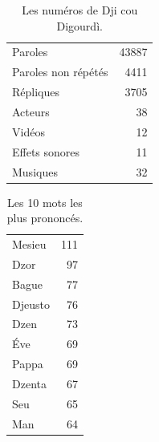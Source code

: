 
\vfill
\begin{table}[h]
\centering
\caption{Les numéros de Dji cou Digourdì.}
\begin{tabular}{lr}
    \toprule
Paroles & 43887 \\
Paroles non répétés & 4411 \\
Répliques & 3705 \\
Acteurs & 38 \\
Vidéos & 12 \\
Effets sonores & 11 \\
Musiques & 32 \\
\bottomrule
\end{tabular}%
\end{table}
\vfill
\newpage
\vfill
\begin{table}[h]
\centering
\caption{Les 10 mots les plus prononcés.}
\begin{tabular}{lr}
    \toprule

\multicolumn{1}{l}{Mesieu} &111\\
\multicolumn{1}{l}{Dzor} &97\\
\multicolumn{1}{l}{Bague} &77\\
\multicolumn{1}{l}{Djeusto} &76\\
\multicolumn{1}{l}{Dzen} &73\\
\multicolumn{1}{l}{Éve} &69\\
\multicolumn{1}{l}{Pappa} &69\\
\multicolumn{1}{l}{Dzenta} &67\\
\multicolumn{1}{l}{Seu} &65\\
\multicolumn{1}{l}{Man} &64\\
\bottomrule
\end{tabular}%
\end{table}
\vfill
\newpage
\scriptsize
